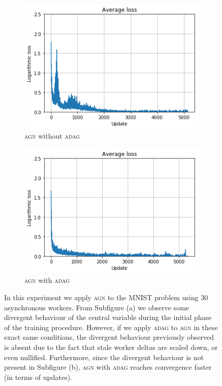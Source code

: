 \begin{figure}[H]
  \centering
  \begin{subfigure}{.49\textwidth}
    \centering
    \includegraphics[width=\linewidth]{resources/images/adag_loss_original}
    \caption{\textsc{agn} without \textsc{adag}}
  \end{subfigure}
  \begin{subfigure}{.49\textwidth}
    \centering
    \includegraphics[width=\linewidth]{resources/images/adag_loss_corrected}
    \caption{\textsc{agn} with \textsc{adag}}
  \end{subfigure}
  \caption{In this experiment we apply \textsc{agn} to the MNIST problem using 30 asynchronous workers. From Subfigure (a) we observe some divergent behaviour of the central variable during the initial phase of the training procedure. However, if we apply \textsc{adag} to \textsc{agn} in these exact same conditions, the divergent behaviour previously observed is absent due to the fact that stale worker deltas are scaled down, or even nullified. Furthermore, since the divergent behaviour is not present in Subfigure (b), \textsc{agn} with \textsc{adag} reaches convergence faster (in terms of updates).}
  \label{fig:applying_adag}
\end{figure}

